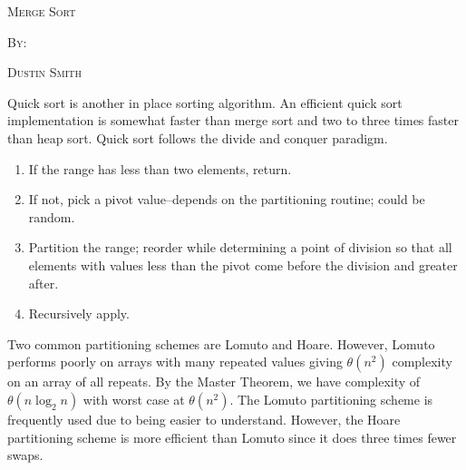 \documentclass[12pt,dvipsnames,svgnames,x11names]{article}
\begin{document}
%
\pagecolor{gray!50}
\begin{center}
  \begin{center}
  \vspace*{\fill}
  \textsc{\LARGE Merge Sort}
  \par\bigskip
  \textsc{By:}
  \par\bigskip
  \textsc{\LARGE Dustin Smith}
  \vspace*{\fill}
\end{center}
\end{center}

\newpage

Quick sort is another in place sorting algorithm. An efficient quick sort implementation is somewhat 
faster than merge sort and two to three times faster than heap sort. Quick sort follows the divide and
conquer paradigm.
\begin{enumerate}
	\item If the range has less than two elements, return.
	\item If not, pick a pivot value--depends on the partitioning routine; could be random.
	\item Partition the range; reorder while determining a point of division so that all elements with values
	less than the pivot come before the division and greater after.
	\item Recursively apply.
\end{enumerate}
Two common partitioning schemes are Lomuto and Hoare. However, Lomuto performs poorly on arrays
with many repeated values giving \(\theta(n^2)\) complexity on an array of all repeats. By the Master 
Theorem, we have complexity of \(\theta(n\log_2 n)\) with worst case at \(\theta (n^2)\). The Lomuto 
partitioning scheme is frequently used due to being easier to understand. However, the Hoare partitioning
scheme is more efficient than Lomuto since it does three times fewer swaps.
\end{document}
